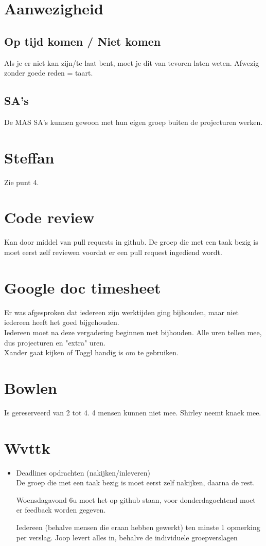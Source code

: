\documentclass{article}
\begin{document}
\section{Aanwezigheid}
\subsection{Op tijd komen / Niet komen}
Als je er niet kan zijn/te laat bent, moet je dit van tevoren laten weten. Afwezig zonder goede reden = taart.

\subsection{SA's}
De MAS SA's kunnen gewoon met hun eigen groep buiten de projecturen werken.

\section{Steffan}
Zie punt 4.

\section{Code review}
Kan door middel van pull requests in github. De groep die met een taak bezig is moet eerst zelf reviewen voordat er een pull request ingediend wordt.

\section{Google doc timesheet}
Er was afgesproken dat iedereen zijn werktijden ging bijhouden, maar niet iedereen heeft het goed bijgehouden.\\
Iedereen moet na deze vergadering beginnen met bijhouden. Alle uren tellen mee, dus projecturen en "extra" uren.\\
Xander gaat kijken of Toggl handig is om te gebruiken.

\section{Bowlen}
Is gereserveerd van 2 tot 4. 4 mensen kunnen niet mee. Shirley neemt knaek mee.

\section{Wvttk}
\begin{itemize}
\item Deadlines opdrachten (nakijken/inleveren)\\
De groep die met een taak bezig is moet eerst zelf nakijken, daarna de rest.

Woensdagavond 6u moet het op github staan, voor donderdagochtend moet er feedback worden gegeven.

Iedereen (behalve mensen die eraan hebben gewerkt) ten minste 1 opmerking per verslag. Joop levert alles in, behalve de individuele groepverslagen
\end{itemize}
\end{document}
